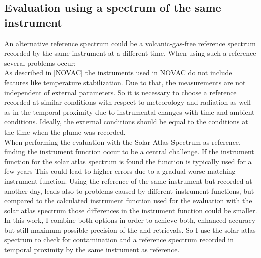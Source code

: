 %
\subsection*{Evaluation using a spectrum of the same instrument}
An alternative reference spectrum could be a volcanic-gas-free reference
spectrum recorded by the same instrument at a different time. When using such a reference several problems occur:\\
As described in \cref{NOVAC} the instruments used in NOVAC do not include features like temperature stabilization. Due to that, the measurements are not independent of external parameters. 
So it is necessary to choose a reference recorded at similar conditions with respect to meteorology and radiation as well as in the temporal proximity due to instrumental changes with time and ambient conditions. Ideally, the external conditions should be equal to the conditions at the time when the plume was recorded.\\
%
When performing the evaluation with the Solar Atlas Spectrum as reference, finding the instrument function occur to be a central challenge. If the instrument function for the solar atlas spectrum is found the function is typically used for a few years This could lead to higher errors due to a gradual worse matching instrument function.
Using the reference of the same instrument but recorded at another day, leads also to problems caused by different instrument functions, but compared to the calculated instrument function used for the evaluation with the solar atlas spectrum those differences in the instrument function could be smaller.
\\
In this work, I combine both options in order to
achieve both, enhanced accuracy but still maximum possible precision of
the  and  retrievals. So I use the solar atlas spectrum to check for contamination and a reference spectrum recorded in temporal proximity by the same instrument as reference.\\
